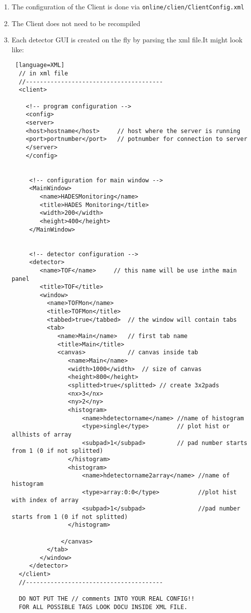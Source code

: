\begin{enumerate}        
\item The configuration of the Client is done via \verb+online/clien/ClientConfig.xml+
\item The Client does not need to be recompiled
\item Each detector GUI is created on the fly by parsing 
the xml file.It might look like:
          	
\begin{lstlisting} [language=XML]        
  // in xml file
  //---------------------------------------
  <client> 
             
    <!-- program configuration -->
    <config>
    <server>
    <host>hostname</host>     // host where the server is running
    <port>portnumber</port>   // potnumber for connection to server
    </server>
    </config>
    
    
     <!-- configuration for main window -->
     <MainWindow>
        <name>HADESMonitoring</name>
        <title>HADES Monitoring</title>
        <width>200</width>
        <height>400</height>
     </MainWindow>
             
             
     <!-- detector configuration -->
     <detector>
        <name>TOF</name>     // this name will be use inthe main panel
        <title>TOF</title>
       	<window>
          <name>TOFMon</name>
          <title>TOFMon</title>
          <tabbed>true</tabbed>  // the window will contain tabs
          <tab>
             <name>Main</name>   // first tab name
             <title>Main</title>
             <canvas>            // canvas inside tab
             	<name>Main</name>
              	<width>1000</width>  // size of canvas
              	<height>800</height>
               	<splitted>true</splitted> // create 3x2pads
               	<nx>3</nx>
               	<ny>2</ny>
              	<histogram>               
              	    <name>hdetectorname</name> //name of histogram
              	    <type>single</type>        // plot hist or allhists of array
              	    <subpad>1</subpad>         // pad number starts from 1 (0 if not splitted)
               	</histogram>
                <histogram>               
               	    <name>hdetectorname2array</name> //name of histogram
              	    <type>array:0:0</type>           //plot hist with index of array
               	    <subpad>1</subpad>               //pad number starts from 1 (0 if not splitted)
               	</histogram>
                             
              </canvas>
          </tab>
        </window>
     </detector>
  </client>
  //---------------------------------------
            
  DO NOT PUT THE // comments INTO YOUR REAL CONFIG!!
  FOR ALL POSSIBLE TAGS LOOK DOCU INSIDE XML FILE.
\end{lstlisting}         
\end{enumerate}        
       
        







